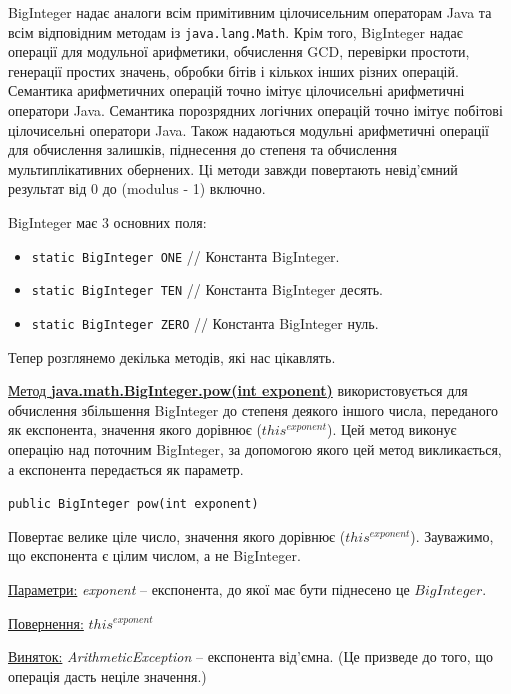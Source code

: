 BigInteger надає аналоги всім примітивним цілочисельним операторам Java та всім відповідним методам із \texttt{java.lang.Math}. Крім того, BigInteger надає операції для модульної арифметики, обчислення GCD, перевірки простоти, генерації простих значень, обробки бітів і кількох інших різних операцій.
Семантика арифметичних операцій точно імітує цілочисельні арифметичні оператори Java. Семантика порозрядних логічних операцій точно імітує побітові цілочисельні оператори Java. Також надаються модульні арифметичні операції для обчислення залишків, піднесення до степеня та обчислення мультиплікативних обернених. Ці методи завжди повертають невід’ємний результат від 0 до (modulus - 1) включно.

BigInteger має $3$ основних поля:
\begin{itemize}
    \item \texttt{static BigInteger	ONE} // Константа BigInteger.
    \item \texttt{static BigInteger	TEN} // Константа BigInteger десять.
    \item \texttt{static BigInteger	ZERO} // Константа BigInteger нуль.
\end{itemize}

Тепер розглянемо декілька методів, які нас цікавлять.

\uline{Метод \textbf{java.math.BigInteger.pow(int exponent)}} використовується для обчислення збільшення BigInteger до степеня деякого іншого числа, переданого як експонента, значення якого дорівнює ($this^{exponent}$). Цей метод виконує операцію над поточним BigInteger, за допомогою якого цей метод викликається, а експонента передається як параметр.

\texttt{public BigInteger pow(int exponent)}

Повертає велике ціле число, значення якого дорівнює ($this^{exponent}$). Зауважимо, що експонента є цілим числом, а не BigInteger.

\uline{Параметри:} \textit{exponent} – експонента, до якої має бути піднесено це $BigInteger$.

\uline{Повернення:} $this^{exponent}$

\uline{Виняток:} \textit{ArithmeticException} – експонента від’ємна. (Це призведе до того, що операція дасть неціле значення.)

